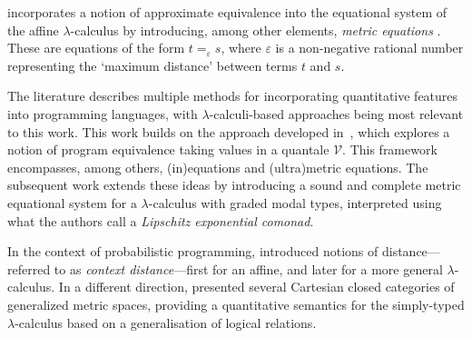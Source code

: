 \documentclass[a4paper,UKenglish,cleveref, autoref, thm-restate]{lipics-v2021}
\begin{document}
\cite{dahlqvist2023syntactic} incorporates a notion of approximate equivalence into the equational system of the affine $\lambda$-calculus by introducing, among other elements, \emph{metric equations} \cite{mardare2016quantitative, mardare2017axiomatizability}. These are equations of the form $t =_{\varepsilon} s$, where $\varepsilon$ is a non-negative rational number representing the `maximum distance' between terms $t$ and $s$.

The literature describes multiple methods for incorporating quantitative features into programming languages, with $\lambda$-calculi-based approaches being most relevant to this work. This work builds on the approach developed in~\cite{dahlqvist2023syntactic}, which explores a notion of program equivalence taking values in a quantale $\mathcal{V}$. This framework encompasses, among others, (in)equations and (ultra)metric equations. The subsequent work \cite{dahlqvistCompleteVEquationalSystem2023} extends these ideas by introducing a sound and complete metric equational system for a $\lambda$-calculus with graded modal types, interpreted using what the authors call a \emph{Lipschitz exponential comonad}.


In the context of probabilistic programming, \cite{crubilleMetricReasoningLterms2015, crubilleMetricReasoninglambda2017} introduced notions of distance—referred to as \emph{context distance}—first for an affine, and later for a more general $\lambda$-calculus. In a different direction, \cite{pistoneGeneralizedMetricSpaces2021} presented several Cartesian closed categories of generalized metric spaces, providing a quantitative semantics for the simply-typed $\lambda$-calculus based on a generalisation of logical relations. 


\end{document}
